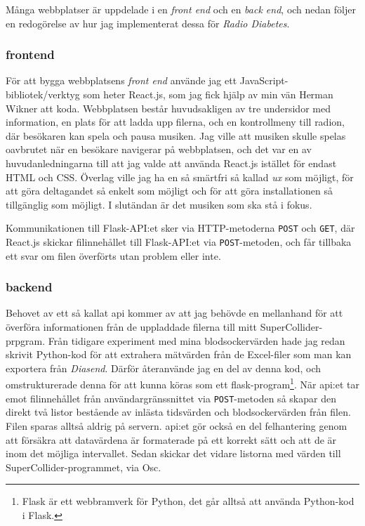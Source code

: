 \documentclass[11pt, a4paper]{article} %
\begin{document}
Många webbplatser är uppdelade i en \emph{front end} och en \emph{back end}, och nedan följer en redogörelse av hur jag implementerat dessa för \emph{Radio Diabetes}. 

\subsubsection*{\gls{frontend}}
För att bygga webbplatsens \emph{front end} använde jag ett JavaScript-bibliotek/verktyg som heter React.js, som jag fick hjälp av min vän Herman Wikner att koda. Webbplatsen består huvudsakligen av tre undersidor med information, en plats för att ladda upp filerna, och en kontrollmeny till radion, där besökaren kan spela och pausa musiken. Jag ville att musiken skulle spelas oavbrutet när en besökare navigerar på webbplatsen, och det var en av huvudanledningarna till att jag valde att använda React.js istället för endast HTML och CSS. Överlag ville jag ha en så smärtfri så kallad \emph{\gls{ux}} som möjligt, för att göra deltagandet så enkelt som möjligt och för att göra installationen så tillgänglig som möjligt. I slutändan är det musiken som ska stå i fokus.

Kommunikationen till Flask-API:et sker via HTTP-metoderna \texttt{POST} och \texttt{GET}, där React.js skickar filinnehållet till Flask-API:et via \texttt{POST}-metoden, och får tillbaka ett svar om filen överförts utan problem eller inte.



\subsubsection*{\gls{backend}}
Behovet av ett så kallat \gls{api} kommer av att jag behövde en mellanhand för att överföra informationen från de uppladdade filerna till mitt SuperCollider-prpgram. Från tidigare experiment med mina blodsockervärden hade jag redan skrivit Python-kod för att extrahera mätvärden från de Excel-filer som man kan exportera från \emph{Diasend}. Därför återanvände jag en del av denna kod, och omstrukturerade denna för att kunna köras som ett \gls{flask}-program\footnote{Flask är ett webbramverk för Python, det går alltså att använda Python-kod i Flask.}. När \gls{api}:et tar emot filinnehållet från användargränssnittet via \texttt{POST}-metoden så skapar den direkt två listor bestående av inlästa tidsvärden och blodsockervärden från filen. Filen sparas alltså aldrig på servern. \gls{api}:et gör också en del felhantering genom att försäkra att datavärdena är formaterade på ett korrekt sätt och att de är inom det möjliga intervallet. Sedan skickar det vidare listorna med värden till SuperCollider-programmet, via Osc. 
\end{document}
